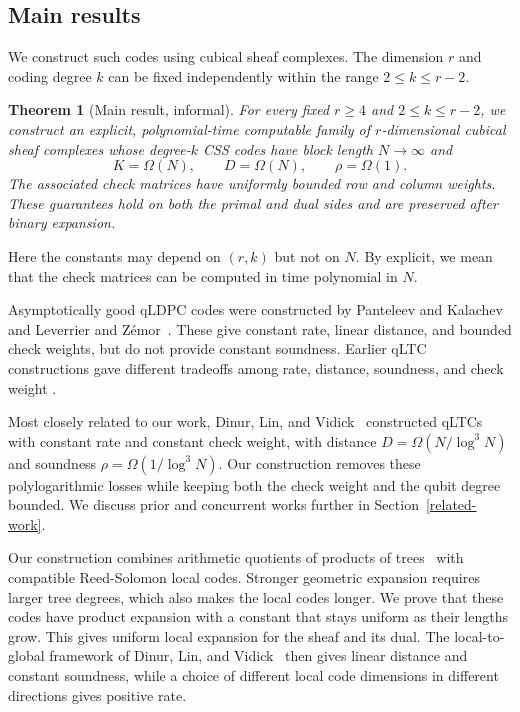 \documentclass[11pt,letterpaper]{article}
\renewcommand{\le}{\leqslant}
\renewcommand{\ge}{\geqslant}
\newtheorem{theorem}{Theorem}[section]
\theoremstyle{definition}
\theoremstyle{remark}
\begin{document}
\begin{quote}
\end{quote}

\subsection{Main results}
We construct such codes using cubical sheaf complexes. The dimension
$r$ and coding degree $k$ can be fixed independently within the range
$2\le k\le r-2$.
\begin{theorem}[Main result, informal]
\label{intro}
For every fixed $r\ge4$ and $2\le k\le r-2$, we construct an explicit,
polynomial-time computable family of $r$-dimensional cubical sheaf
complexes whose degree-$k$ CSS codes have block length $N\to\infty$ and
$$
K=\Omega(N),\qquad
D=\Omega(N),\qquad
\rho=\Omega(1).$$
The associated check matrices have uniformly bounded row and column
weights. These guarantees hold on both the primal and dual sides and
are preserved after binary expansion.
\end{theorem}

Here the constants may depend on $(r,k)$ but not on $N$. By explicit,
we mean that the check matrices can be computed in time polynomial
in $N$.

Asymptotically good qLDPC codes were constructed by Panteleev and
Kalachev~\cite{PanteleevKalachev2022} and Leverrier and
Z{\'e}mor~\cite{LeverrierZemor2022}. These give constant rate, linear
distance, and bounded check weights, but do not provide constant
soundness. Earlier qLTC constructions gave different tradeoffs among
rate, distance, soundness, and check weight
\cite{QuantumCodesFromHighDimensionalManifolds,
TowardsLocalTestabilityForQuantumCoding,CrossEtAl2024,
TradeoffConstructionsForQLTCs}.

Most closely related to our work, Dinur, Lin, and
Vidick~\cite{DinurLinVidick2024} constructed qLTCs with constant rate
and constant check weight, with distance
$D=\Omega(N/\log^3 N)$ and soundness $\rho=\Omega(1/\log^3 N)$.
Our construction removes these polylogarithmic losses while keeping
both the check weight and the qubit degree bounded. We discuss prior
and concurrent works further in Section~\ref{related-work}.

Our construction combines arithmetic quotients of products of
trees~\cite{RSV2019,HLMRZ2025} with compatible Reed-Solomon local
codes. Stronger geometric expansion requires larger tree degrees,
which also makes the local codes longer. We prove that these codes
have product expansion with a constant that stays uniform as their
lengths grow. This gives uniform local expansion for the sheaf and
its dual. The local-to-global framework of Dinur, Lin, and
Vidick~\cite{DinurLinVidick2024} then gives linear distance and
constant soundness, while a choice of different local code dimensions
in different directions gives positive rate.
\end{document}
